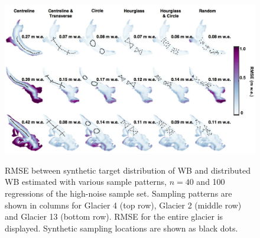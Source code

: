 \documentclass{article}
\begin{document}
\begin{figure}
	\centering
	\includegraphics[width =\textwidth]{Pulwicki_Fig4.pdf}\\
	\caption{RMSE between synthetic target distribution of WB and distributed WB estimated with various sample patterns, $n=40$ and 100 regressions of the high-noise sample set. Sampling patterns are shown in columns for Glacier 4 (top row), Glacier 2 (middle row) and Glacier 13 (bottom row). RMSE for the entire glacier is displayed. Synthetic sampling locations are shown as black dots.}
	\label{fig:SynObsRMSEmap}
\end{figure}
\end{document}
